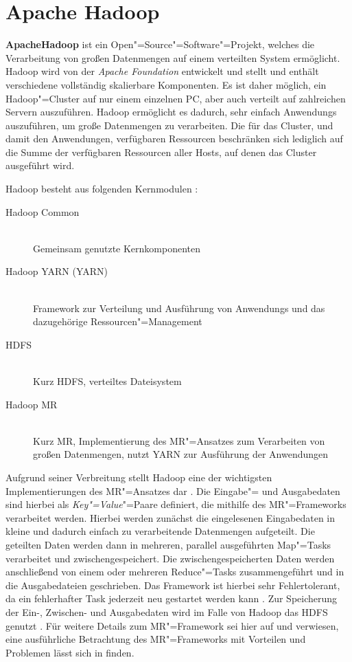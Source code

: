 \section{Apache Hadoop}
\label{sec:hadoop}

\textbf{Apache\texttrademark Hadoop\textregistered} ist ein Open"=Source"=Software"=Projekt, welches die Verarbeitung von großen Datenmengen auf einem verteilten System ermöglicht.
Hadoop wird von der \emph{Apache Foundation} entwickelt und stellt und enthält verschiedene vollständig skalierbare Komponenten.
Es ist daher möglich, ein Hadoop"=Cluster auf nur einem einzelnen PC, aber auch verteilt auf zahlreichen Servern auszuführen.
Hadoop ermöglicht es dadurch, sehr einfach \glspl{Anwendung} auszuführen, um große Datenmengen zu verarbeiten.
Die für das Cluster, und damit den Anwendungen, verfügbaren Ressourcen beschränken sich lediglich auf die Summe der verfügbaren Ressourcen aller Hosts, auf denen das Cluster ausgeführt wird.

Hadoop besteht aus folgenden Kernmodulen \cite{HadoopHomePage}:

\begin{description}
	\item[Hadoop Common] \hfill \\
        Gemeinsam genutzte Kernkomponenten
	\item[Hadoop \acrshort{YARN} (\acrlong{YARN})] \hfill \\
        Framework zur Verteilung und Ausführung von \glspl{Anwendung} und das dazugehörige Ressourcen"=Management
	\item[\acrlong{HDFS}] \hfill \\
        Kurz \acrshort{HDFS}, verteiltes Dateisystem
	\item[Hadoop \acrlong{MR}] \hfill \\
        Kurz \acrshort{MR}, Implementierung des \gls{MR}"=Ansatzes zum Verarbeiten von großen Datenmengen, nutzt \gls{YARN} zur Ausführung der Anwendungen
\end{description}

Aufgrund seiner Verbreitung stellt Hadoop eine der wichtigsten Implementierungen des \gls{MR}"=Ansatzes dar \cite{PoweredByHadoop}.
Die Eingabe"= und Ausgabedaten sind hierbei als \emph{Key"=Value}"=Paare definiert, die mithilfe des \gls{MR}"=Frameworks verarbeitet werden.
Hierbei werden zunächst die eingelesenen Eingabedaten in kleine und dadurch einfach zu verarbeitende Datenmengen aufgeteilt.
Die geteilten Daten werden dann in mehreren, parallel ausgeführten Map"=Tasks verarbeitet und zwischengespeichert.
Die zwischengespeicherten Daten werden anschließend von einem oder mehreren Reduce"=Tasks zusammengeführt und in die Ausgabedateien geschrieben.
Das Framework ist hierbei sehr Fehlertolerant, da ein fehlerhafter Task jederzeit neu gestartet werden kann \cite{Dean2004,Dean2010}.
Zur Speicherung der Ein-, Zwischen- und Ausgabedaten wird im Falle von Hadoop das \gls{HDFS} genutzt \cite{HadoopMapRedTutorial271}.
Für weitere Details zum \gls{MR}"=Framework sei hier auf \cite{Dean2004} und \cite{Dean2010} verwiesen, eine ausführliche Betrachtung des \gls{MR}"=Frameworks mit Vorteilen und Problemen lässt sich in \cite{Lee2012} finden.


